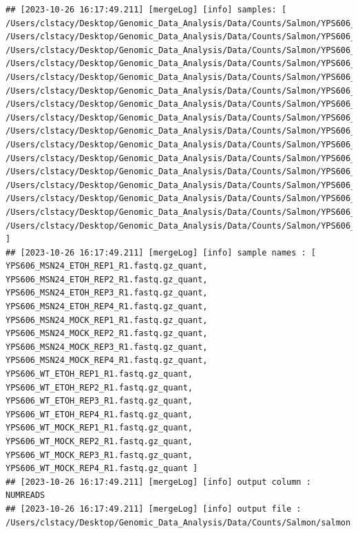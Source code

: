 \documentclass[
]{book}
\begin{document}
\begin{verbatim}
## [2023-10-26 16:17:49.211] [mergeLog] [info] samples: [ /Users/clstacy/Desktop/Genomic_Data_Analysis/Data/Counts/Salmon/YPS606_MSN24_ETOH_REP1_R1.fastq.gz_quant, /Users/clstacy/Desktop/Genomic_Data_Analysis/Data/Counts/Salmon/YPS606_MSN24_ETOH_REP2_R1.fastq.gz_quant, /Users/clstacy/Desktop/Genomic_Data_Analysis/Data/Counts/Salmon/YPS606_MSN24_ETOH_REP3_R1.fastq.gz_quant, /Users/clstacy/Desktop/Genomic_Data_Analysis/Data/Counts/Salmon/YPS606_MSN24_ETOH_REP4_R1.fastq.gz_quant, /Users/clstacy/Desktop/Genomic_Data_Analysis/Data/Counts/Salmon/YPS606_MSN24_MOCK_REP1_R1.fastq.gz_quant, /Users/clstacy/Desktop/Genomic_Data_Analysis/Data/Counts/Salmon/YPS606_MSN24_MOCK_REP2_R1.fastq.gz_quant, /Users/clstacy/Desktop/Genomic_Data_Analysis/Data/Counts/Salmon/YPS606_MSN24_MOCK_REP3_R1.fastq.gz_quant, /Users/clstacy/Desktop/Genomic_Data_Analysis/Data/Counts/Salmon/YPS606_MSN24_MOCK_REP4_R1.fastq.gz_quant, /Users/clstacy/Desktop/Genomic_Data_Analysis/Data/Counts/Salmon/YPS606_WT_ETOH_REP1_R1.fastq.gz_quant, /Users/clstacy/Desktop/Genomic_Data_Analysis/Data/Counts/Salmon/YPS606_WT_ETOH_REP2_R1.fastq.gz_quant, /Users/clstacy/Desktop/Genomic_Data_Analysis/Data/Counts/Salmon/YPS606_WT_ETOH_REP3_R1.fastq.gz_quant, /Users/clstacy/Desktop/Genomic_Data_Analysis/Data/Counts/Salmon/YPS606_WT_ETOH_REP4_R1.fastq.gz_quant, /Users/clstacy/Desktop/Genomic_Data_Analysis/Data/Counts/Salmon/YPS606_WT_MOCK_REP1_R1.fastq.gz_quant, /Users/clstacy/Desktop/Genomic_Data_Analysis/Data/Counts/Salmon/YPS606_WT_MOCK_REP2_R1.fastq.gz_quant, /Users/clstacy/Desktop/Genomic_Data_Analysis/Data/Counts/Salmon/YPS606_WT_MOCK_REP3_R1.fastq.gz_quant, /Users/clstacy/Desktop/Genomic_Data_Analysis/Data/Counts/Salmon/YPS606_WT_MOCK_REP4_R1.fastq.gz_quant ]
## [2023-10-26 16:17:49.211] [mergeLog] [info] sample names : [ YPS606_MSN24_ETOH_REP1_R1.fastq.gz_quant, YPS606_MSN24_ETOH_REP2_R1.fastq.gz_quant, YPS606_MSN24_ETOH_REP3_R1.fastq.gz_quant, YPS606_MSN24_ETOH_REP4_R1.fastq.gz_quant, YPS606_MSN24_MOCK_REP1_R1.fastq.gz_quant, YPS606_MSN24_MOCK_REP2_R1.fastq.gz_quant, YPS606_MSN24_MOCK_REP3_R1.fastq.gz_quant, YPS606_MSN24_MOCK_REP4_R1.fastq.gz_quant, YPS606_WT_ETOH_REP1_R1.fastq.gz_quant, YPS606_WT_ETOH_REP2_R1.fastq.gz_quant, YPS606_WT_ETOH_REP3_R1.fastq.gz_quant, YPS606_WT_ETOH_REP4_R1.fastq.gz_quant, YPS606_WT_MOCK_REP1_R1.fastq.gz_quant, YPS606_WT_MOCK_REP2_R1.fastq.gz_quant, YPS606_WT_MOCK_REP3_R1.fastq.gz_quant, YPS606_WT_MOCK_REP4_R1.fastq.gz_quant ]
## [2023-10-26 16:17:49.211] [mergeLog] [info] output column : NUMREADS
## [2023-10-26 16:17:49.211] [mergeLog] [info] output file : /Users/clstacy/Desktop/Genomic_Data_Analysis/Data/Counts/Salmon/salmon.gene_counts.merged.yeast.tsv

\end{verbatim}
\end{document}
